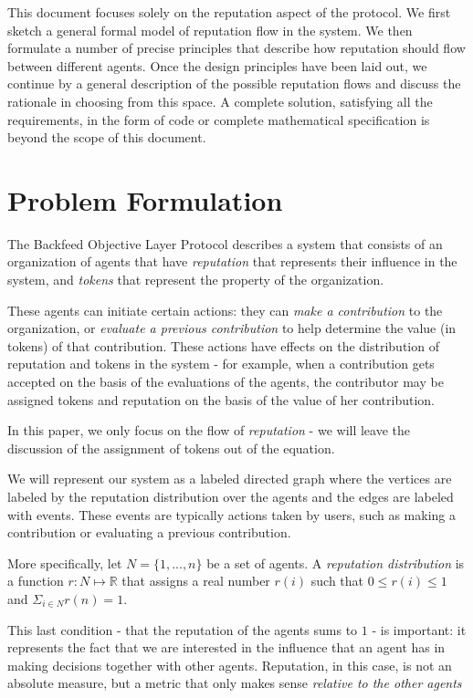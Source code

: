 \documentclass{article}
\begin{document}
This document focuses solely on the reputation aspect of the protocol.
We first sketch a general formal model  of reputation flow in the system. 
We then formulate a number of precise principles that describe how reputation should flow between different agents. Once the design principles have been laid out, we continue by a general description of the possible reputation flows and discuss the rationale in choosing from this space. A complete solution, satisfying all the requirements, in the form of code or complete mathematical specification is beyond the scope of this document.

\section{Problem Formulation}

The Backfeed Objective Layer Protocol describes a system that consists of an organization  of agents that have {\em reputation} that represents their influence in the system, and {\em tokens} that represent the property of the organization.

These agents can initiate certain actions: they can {\em make a contribution} to the organization, or {\em evaluate a previous contribution} to help determine the value (in tokens) of that contribution. These actions have effects on the distribution of reputation and tokens in the system - for example, when a contribution gets accepted on the basis of the evaluations of the agents, the contributor may be assigned tokens and reputation on the basis of the value of her contribution.

In this paper, we only focus on the flow of {\em reputation}  - we will leave the discussion of the assignment of tokens out of the equation.

We will represent our system as a labeled directed graph where the vertices are labeled by the reputation distribution over the agents and the edges are labeled with events. These events are typically actions taken by users, such as making a contribution or evaluating a previous contribution. 

More specifically, let $N=\{1, ..., n\}$ be a set of agents. 
A {\em reputation distribution} is a function $r: N \mapsto \mathbb{R}$ that assigns a real number $r(i)$ such that $0 \leq r(i) \leq 1$ and $\Sigma_{i \in N} r(n) = 1$.

This last condition - that the reputation of the agents sums to $1$ - is important: it represents the fact that we are interested in the influence that an agent has in making decisions together with other agents. Reputation, in this case, is not an absolute measure, but a metric that only makes sense {\em relative to the other agents}
\end{document}
